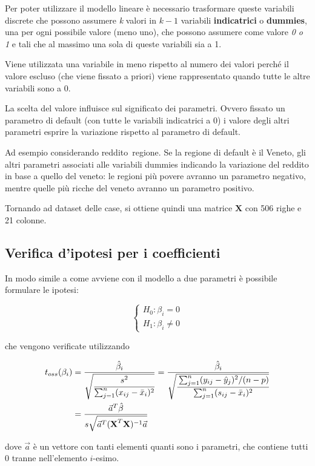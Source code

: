 Per poter utilizzare il modello lineare è necessario trasformare queste variabili discrete che possono assumere \textit{k} valori in $ k -1 $ variabili \textbf{indicatrici} o \textbf{dummies}, una per ogni possibile valore (meno uno), che possono assumere come valore \textit{0 o 1} e tali che al massimo una sola di queste variabili sia a 1.

Viene utilizzata una variabile in meno rispetto al numero dei valori perché il valore escluso (che viene fissato a priori) viene rappresentato quando tutte le altre variabili sono a 0.

La scelta del valore influisce sul significato dei parametri. Ovvero fissato un parametro di default (con tutte le variabili indicatrici a 0) i valore degli altri parametri esprire la variazione rispetto al parametro di default.

Ad esempio considerando reddito~regione. Se la regione di default è il Veneto, gli altri parametri associati alle variabili dummies indicando la variazione del reddito in base a quello del veneto: le regioni più povere avranno un parametro negativo, mentre quelle più ricche del veneto avranno un parametro positivo.

Tornando ad dataset delle case, si ottiene quindi una matrice $ \textbf{X} $ con 506 righe e 21 colonne.

\subsection{Verifica d'ipotesi per i coefficienti}

In modo simile a come avviene con il modello a due parametri è possibile formulare le ipotesi:

$$
\begin{cases}
H_0 : \beta_i = 0\\
H_1 : \beta_i \neq 0
\end{cases}
$$

che vengono verificate utilizzando

\begin{align*}
t_{oss}(\beta_i) &= \frac{\hat{\beta}_i}{\sqrt{\cfrac{s^2}{\sum_{j=1}^{n} (x_{ij} - \bar{x}_i)^2}}} = \frac{\hat{\beta}_i}{ \sqrt{\cfrac{ \sum_{j=1}^{n}(y_{ij} - \hat{y}_j)^2 /(n-p) }{ \sum_{j=1}^{n} (s_{ij} - \bar{x}_i)^2 } } } \\
&= \frac{\vec{a}^T \hat{\beta}}{ s \sqrt{\vec{a}^T (\textbf{X}^T\textbf{X} )^{-1} \vec{a}} }
\end{align*}

dove $ \vec{a} $ è un vettore con tanti elementi quanti sono i parametri, che contiene tutti 0 tranne nell'elemento $ i $-esimo.

